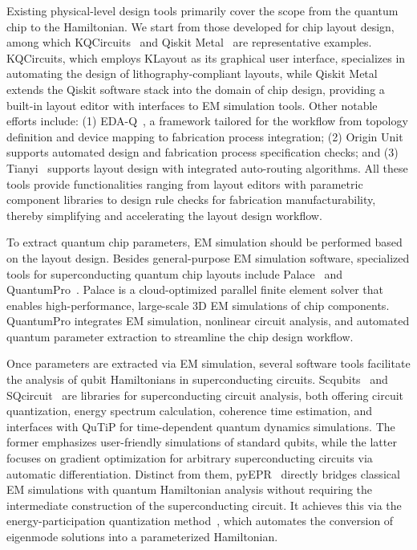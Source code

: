 \documentclass[a4paper,onecolumn,11pt,unpublished]{quantumarticle}
\begin{document}
Existing physical-level design tools primarily cover the scope from the quantum chip to the Hamiltonian. We start from those developed for chip layout design, among which KQCircuits~\cite{Cucurachi2021KQCircuits} and Qiskit Metal~\cite{Minev2021Qiskit} are representative examples. 
KQCircuits, which employs KLayout as its graphical user interface, specializes in automating the design of lithography-compliant layouts, while Qiskit Metal extends the Qiskit software stack into the domain of chip design, providing a built-in layout editor with interfaces to EM simulation tools. Other notable efforts include: (1) EDA-Q~\cite{Zhao2025EDAQ}, a framework tailored for the workflow from topology definition and device mapping to fabrication process integration; (2) Origin Unit~\cite{OriginUnit} supports automated design and fabrication process specification checks; and (3) Tianyi~\cite{Tianyi} supports layout design with integrated auto-routing algorithms. All these tools provide functionalities ranging from layout editors with parametric component libraries to design rule checks for fabrication manufacturability, thereby simplifying and accelerating the layout design workflow.

To extract quantum chip parameters, EM simulation should be performed based on the layout design. Besides general-purpose EM simulation software, specialized tools for superconducting quantum chip layouts include Palace~\cite{Grimberg2023Palace} and QuantumPro~\cite{QuantumPro}. Palace is a cloud-optimized parallel finite element solver that enables high-performance, large-scale 3D EM simulations of chip components. QuantumPro integrates EM simulation, nonlinear circuit analysis, and automated quantum parameter extraction to streamline the chip design workflow.

Once parameters are extracted via EM simulation, several software tools facilitate the analysis of qubit Hamiltonians in superconducting circuits. Scqubits~\cite{Groszkowski2021Scqubits, Chitta2022Computeraided} and SQcircuit~\cite{Rajabzadeh2023Analysis, Rajabzadeh2024A} are libraries for superconducting circuit analysis, both offering circuit quantization, energy spectrum calculation, coherence time estimation, and interfaces with QuTiP for time-dependent quantum dynamics simulations. The former emphasizes user-friendly simulations of standard qubits, while the latter focuses on gradient optimization for arbitrary superconducting circuits via automatic differentiation. Distinct from them, pyEPR~\cite{Minev2021pyEPR} directly bridges classical EM simulations with quantum Hamiltonian analysis without requiring the intermediate construction of the superconducting circuit. It achieves this via the energy-participation quantization method~\cite{Minev2021Energyparticipation}, which automates the conversion of eigenmode solutions into a parameterized Hamiltonian.
\end{document}
